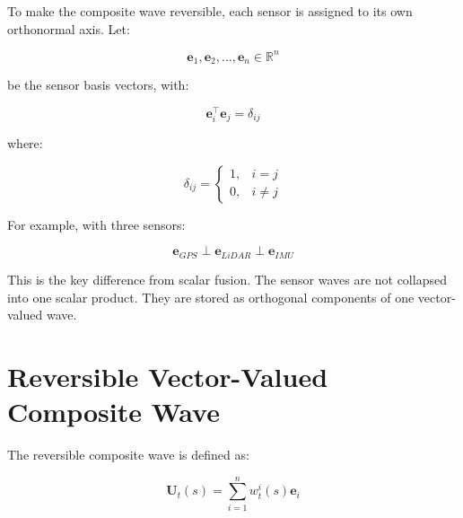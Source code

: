 \documentclass[a4paper]{article}
\begin{document}
        To make the composite wave reversible, each sensor is assigned to its own orthonormal axis.
        Let:
        
        \begin{equation}
            \mathbf{e}_1,
            \mathbf{e}_2,
            \ldots,
            \mathbf{e}_n
            \in
            \mathbb{R}^{n}
        \end{equation}
        
        be the sensor basis vectors, with:
        
        \begin{equation}
            \mathbf{e}_i^{\top}
            \mathbf{e}_j
            =
            \delta_{ij}
        \end{equation}
        
        where:
        
        \begin{equation}
            \delta_{ij}
            =
            \begin{cases}
                1,
                &
                i=j
                \\
                0,
                &
                i \neq j
            \end{cases}
        \end{equation}
        
        For example, with three sensors:
        
        \begin{equation}
            \mathbf{e}_{GPS}
            \perp
            \mathbf{e}_{LiDAR}
            \perp
            \mathbf{e}_{IMU}
        \end{equation}
        
        This is the key difference from scalar fusion.
        The sensor waves are not collapsed into one scalar product.
        They are stored as orthogonal components of one vector-valued wave.
    
    
    \section{Reversible Vector-Valued Composite Wave}
        
        The reversible composite wave is defined as:
        
        \begin{equation}
            \mathbf{U}_t(s)
            =
            \sum_{i=1}^{n}
            w_t^i(s)
            \mathbf{e}_i
        \end{equation}
        
\end{document}

